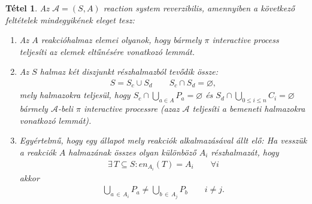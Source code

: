 \documentclass[12pt]{article}
\theoremstyle{definition}
\theoremstyle{remark}
\theoremstyle{plain}
\newtheorem*{theorem*}{Tétel}
\theoremstyle{plain}
\let\emptyset\varnothing
\newcommand{\en}{\textit{en}}
\begin{document}
    \begin{theorem*}
        Az $\mathscr{A} = (S, A)$ \textit{reaction system} reverzibilis, amennyiben a következő feltételek mindegyikének eleget tesz:
        \begin{enumerate}[label={(\arabic*)}]
            \item
            Az $A$ reakcióhalmaz elemei olyanok, hogy bármely $\pi$ \textit{interactive process} teljesíti az elemek eltűnésére vonatkozó lemmát.

            \item
            Az $S$ halmaz két diszjunkt részhalmazból tevődik össze:
            \begin{align*}
                S = S_{c} \cup S_{d} \qquad S_{c} \cap S_{d} = \emptyset,
            \end{align*}
            mely halmazokra teljesül, hogy $S_{c} \cap \bigcup_{a \in A} P_{a} = \emptyset$ és $S_{d} \cap \bigcup_{0 \leq i \leq n} C_{i} = \emptyset$ bármely $\mathscr{A}$-beli $\pi$ \textit{interactive processre} (azaz $\mathscr{A}$ teljesíti a bemeneti halmazokra vonatkozó lemmát).

            \item
            Egyértelmű, hogy egy állapot mely reakciók alkalmazásával állt elő: Ha vesszük a reakciók $A$ halmazának összes olyan különböző $A_i$ részhalmazát, hogy
            \begin{align*}
                \exists \, T \subseteq S : \en_{A_{i}}(T) = A_{i} \qquad \forall i
            \end{align*}
            akkor
            \begin{align*}
                \bigcup\limits_{a \,\in\, A_{i}} P_{a} \neq \bigcup\limits_{b \,\in\, A_{j}} P_{b} \qquad i \neq j.
            \end{align*}
        \end{enumerate}
    \end{theorem*}
\end{document}
